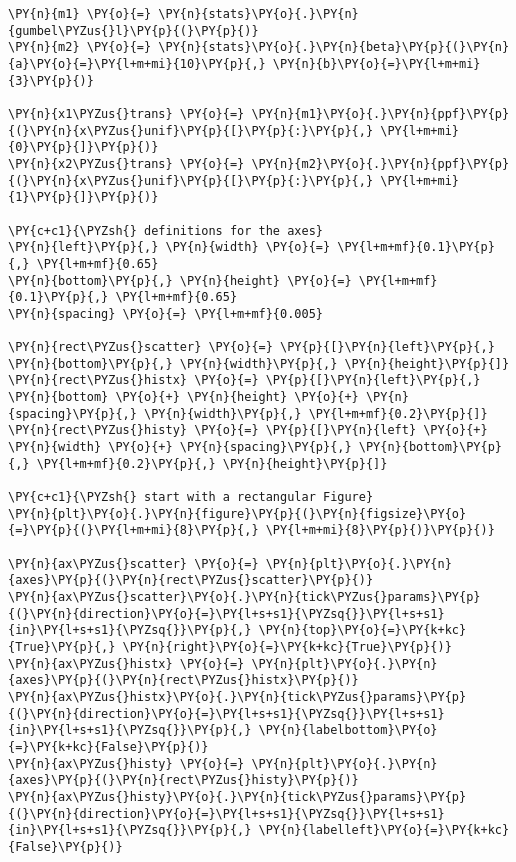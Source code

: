     \begin{tcolorbox}[breakable, size=fbox, boxrule=1pt, pad at break*=1mm,colback=cellbackground, colframe=cellborder]
\begin{Verbatim}[commandchars=\\\{\}]
\PY{n}{m1} \PY{o}{=} \PY{n}{stats}\PY{o}{.}\PY{n}{gumbel\PYZus{}l}\PY{p}{(}\PY{p}{)}
\PY{n}{m2} \PY{o}{=} \PY{n}{stats}\PY{o}{.}\PY{n}{beta}\PY{p}{(}\PY{n}{a}\PY{o}{=}\PY{l+m+mi}{10}\PY{p}{,} \PY{n}{b}\PY{o}{=}\PY{l+m+mi}{3}\PY{p}{)}

\PY{n}{x1\PYZus{}trans} \PY{o}{=} \PY{n}{m1}\PY{o}{.}\PY{n}{ppf}\PY{p}{(}\PY{n}{x\PYZus{}unif}\PY{p}{[}\PY{p}{:}\PY{p}{,} \PY{l+m+mi}{0}\PY{p}{]}\PY{p}{)}
\PY{n}{x2\PYZus{}trans} \PY{o}{=} \PY{n}{m2}\PY{o}{.}\PY{n}{ppf}\PY{p}{(}\PY{n}{x\PYZus{}unif}\PY{p}{[}\PY{p}{:}\PY{p}{,} \PY{l+m+mi}{1}\PY{p}{]}\PY{p}{)}

\PY{c+c1}{\PYZsh{} definitions for the axes}
\PY{n}{left}\PY{p}{,} \PY{n}{width} \PY{o}{=} \PY{l+m+mf}{0.1}\PY{p}{,} \PY{l+m+mf}{0.65}
\PY{n}{bottom}\PY{p}{,} \PY{n}{height} \PY{o}{=} \PY{l+m+mf}{0.1}\PY{p}{,} \PY{l+m+mf}{0.65}
\PY{n}{spacing} \PY{o}{=} \PY{l+m+mf}{0.005}

\PY{n}{rect\PYZus{}scatter} \PY{o}{=} \PY{p}{[}\PY{n}{left}\PY{p}{,} \PY{n}{bottom}\PY{p}{,} \PY{n}{width}\PY{p}{,} \PY{n}{height}\PY{p}{]}
\PY{n}{rect\PYZus{}histx} \PY{o}{=} \PY{p}{[}\PY{n}{left}\PY{p}{,} \PY{n}{bottom} \PY{o}{+} \PY{n}{height} \PY{o}{+} \PY{n}{spacing}\PY{p}{,} \PY{n}{width}\PY{p}{,} \PY{l+m+mf}{0.2}\PY{p}{]}
\PY{n}{rect\PYZus{}histy} \PY{o}{=} \PY{p}{[}\PY{n}{left} \PY{o}{+} \PY{n}{width} \PY{o}{+} \PY{n}{spacing}\PY{p}{,} \PY{n}{bottom}\PY{p}{,} \PY{l+m+mf}{0.2}\PY{p}{,} \PY{n}{height}\PY{p}{]}

\PY{c+c1}{\PYZsh{} start with a rectangular Figure}
\PY{n}{plt}\PY{o}{.}\PY{n}{figure}\PY{p}{(}\PY{n}{figsize}\PY{o}{=}\PY{p}{(}\PY{l+m+mi}{8}\PY{p}{,} \PY{l+m+mi}{8}\PY{p}{)}\PY{p}{)}

\PY{n}{ax\PYZus{}scatter} \PY{o}{=} \PY{n}{plt}\PY{o}{.}\PY{n}{axes}\PY{p}{(}\PY{n}{rect\PYZus{}scatter}\PY{p}{)}
\PY{n}{ax\PYZus{}scatter}\PY{o}{.}\PY{n}{tick\PYZus{}params}\PY{p}{(}\PY{n}{direction}\PY{o}{=}\PY{l+s+s1}{\PYZsq{}}\PY{l+s+s1}{in}\PY{l+s+s1}{\PYZsq{}}\PY{p}{,} \PY{n}{top}\PY{o}{=}\PY{k+kc}{True}\PY{p}{,} \PY{n}{right}\PY{o}{=}\PY{k+kc}{True}\PY{p}{)}
\PY{n}{ax\PYZus{}histx} \PY{o}{=} \PY{n}{plt}\PY{o}{.}\PY{n}{axes}\PY{p}{(}\PY{n}{rect\PYZus{}histx}\PY{p}{)}
\PY{n}{ax\PYZus{}histx}\PY{o}{.}\PY{n}{tick\PYZus{}params}\PY{p}{(}\PY{n}{direction}\PY{o}{=}\PY{l+s+s1}{\PYZsq{}}\PY{l+s+s1}{in}\PY{l+s+s1}{\PYZsq{}}\PY{p}{,} \PY{n}{labelbottom}\PY{o}{=}\PY{k+kc}{False}\PY{p}{)}
\PY{n}{ax\PYZus{}histy} \PY{o}{=} \PY{n}{plt}\PY{o}{.}\PY{n}{axes}\PY{p}{(}\PY{n}{rect\PYZus{}histy}\PY{p}{)}
\PY{n}{ax\PYZus{}histy}\PY{o}{.}\PY{n}{tick\PYZus{}params}\PY{p}{(}\PY{n}{direction}\PY{o}{=}\PY{l+s+s1}{\PYZsq{}}\PY{l+s+s1}{in}\PY{l+s+s1}{\PYZsq{}}\PY{p}{,} \PY{n}{labelleft}\PY{o}{=}\PY{k+kc}{False}\PY{p}{)}


\end{Verbatim}
\end{tcolorbox}

